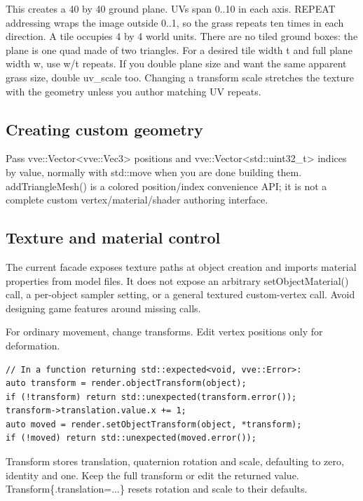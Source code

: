 \documentclass[11pt,a4paper]{article}
\begin{document}
This creates a 40 by 40 ground plane. UVs span 0..10 in each axis. REPEAT addressing wraps the image outside 0..1, so the grass repeats ten times in each direction. A tile occupies 4 by 4 world units. There are no tiled ground boxes: the plane is one quad made of two triangles. For a desired tile width t and full plane width w, use w/t repeats. If you double plane size and want the same apparent grass size, double uv\_scale too. Changing a transform scale stretches the texture with the geometry unless you author matching UV repeats.

\subsection*{Creating custom geometry}
Pass vve::Vector<vve::Vec3> positions and vve::Vector<std::uint32\_t> indices by value, normally with std::move when you are done building them. addTriangleMesh() is a colored position/index convenience API; it is not a complete custom vertex/material/shader authoring interface.

\subsection*{Texture and material control}
The current facade exposes texture paths at object creation and imports material properties from model files. It does not expose an arbitrary setObjectMaterial() call, a per-object sampler setting, or a general textured custom-vertex call. Avoid designing game features around missing calls.

\label{core-61}
For ordinary movement, change transforms. Edit vertex positions only for deformation.

\begin{lstlisting}[language={}]
// In a function returning std::expected<void, vve::Error>:
auto transform = render.objectTransform(object);
if (!transform) return std::unexpected(transform.error());
transform->translation.value.x += 1;
auto moved = render.setObjectTransform(object, *transform);
if (!moved) return std::unexpected(moved.error());
\end{lstlisting}

Transform stores translation, quaternion rotation and scale, defaulting to zero, identity and one. Keep the full transform or edit the returned value. Transform\{.translation=...\} resets rotation and scale to their defaults.
\end{document}

